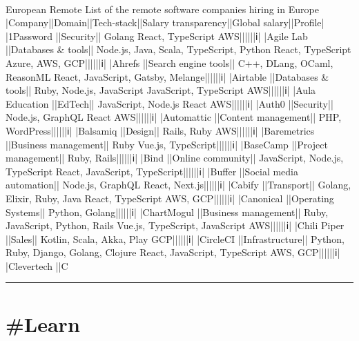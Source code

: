 \documentclass[10pt,a4paper]{article}
\begin{document}
\begin{multicols*}{2}
\paragraph{}
European Remote
List of the remote software companies hiring in Europe
|Company||Domain||Tech-stack||Salary transparency||Global salary||Profile|
|1Password ||Security|| Golang  React, TypeScript  AWS||||||ℹ|
|Agile Lab ||Databases \& tools|| Node.js, Java, Scala, TypeScript, Python  React, TypeScript  Azure, AWS, GCP||||||ℹ|
|Ahrefs ||Search engine tools|| C++, DLang, OCaml, ReasonML  React, JavaScript, Gatsby, Melange||||||ℹ|
|Airtable ||Databases \& tools|| Ruby, Node.js, JavaScript  JavaScript, TypeScript  AWS||||||ℹ|
|Aula Education ||EdTech|| JavaScript, Node.js  React  AWS||||||ℹ|
|Auth0 ||Security|| Node.js, GraphQL  React  AWS||||||ℹ|
|Automattic ||Content management|| PHP, WordPress||||||ℹ|
|Balsamiq ||Design|| Rails, Ruby  AWS||||||ℹ|
|Baremetrics ||Business management|| Ruby  Vue.js, TypeScript||||||ℹ|
|BaseCamp ||Project management|| Ruby, Rails||||||ℹ|
|Bind ||Online community|| JavaScript, Node.js, TypeScript  React, JavaScript, TypeScript||||||ℹ|
|Buffer ||Social media automation|| Node.js, GraphQL  React, Next.js||||||ℹ|
|Cabify ||Transport|| Golang, Elixir, Ruby, Java  React, TypeScript  AWS, GCP||||||ℹ|
|Canonical ||Operating Systems|| Python, Golang||||||ℹ|
|ChartMogul ||Business management|| Ruby, JavaScript, Python, Rails  Vue.js, TypeScript, JavaScript  AWS||||||ℹ|
|Chili Piper ||Sales|| Kotlin, Scala, Akka, Play  GCP||||||ℹ|
|CircleCI ||Infrastructure|| Python, Ruby, Django, Golang, Clojure  React, JavaScript, TypeScript  AWS, GCP||||||ℹ|
|Clevertech ||C
\par\noindent\textcolor{red}{\rule{\linewidth}{0.2mm}}
\vfill
\null
\end{multicols*}

\newpage
\section{\#Learn}
\end{document}
